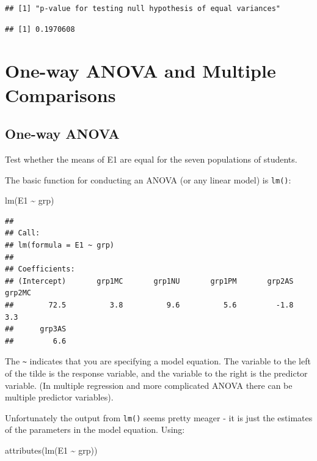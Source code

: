\documentclass[
]{book}
\newenvironment{Shaded}{\begin{snugshade}}{\end{snugshade}}
\newcommand{\FunctionTok}[1]{\textcolor[rgb]{0.00,0.00,0.00}{#1}}
\newcommand{\NormalTok}[1]{#1}
\newcommand{\SpecialCharTok}[1]{\textcolor[rgb]{0.00,0.00,0.00}{#1}}
\begin{document}
\begin{verbatim}
## [1] "p-value for testing null hypothesis of equal variances"
\end{verbatim}

\begin{verbatim}
## [1] 0.1970608
\end{verbatim}

\hypertarget{one-way-anova}{%
\section{One-way ANOVA and Multiple Comparisons}\label{one-way-anova}}

\hypertarget{one-way-anova-1}{%
\subsection{One-way ANOVA}\label{one-way-anova-1}}

Test whether the means of E1 are equal for the seven populations of students.

The basic function for conducting an ANOVA (or any linear model) is \texttt{lm()}:

\begin{Shaded}
\begin{Highlighting}[]
\FunctionTok{lm}\NormalTok{(E1 }\SpecialCharTok{\textasciitilde{}}\NormalTok{ grp)}
\end{Highlighting}
\end{Shaded}

\begin{verbatim}
## 
## Call:
## lm(formula = E1 ~ grp)
## 
## Coefficients:
## (Intercept)       grp1MC       grp1NU       grp1PM       grp2AS       grp2MC  
##        72.5          3.8          9.6          5.6         -1.8          3.3  
##      grp3AS  
##         6.6
\end{verbatim}

The \texttt{\textasciitilde{}} indicates that you are specifying a model equation. The variable to the left of the tilde is the response variable, and the variable to the right is the predictor variable. (In multiple regression and more complicated ANOVA there can be multiple predictor variables).

Unfortunately the output from \texttt{lm()} seems pretty meager - it is just the estimates of the parameters in the model equation. Using:

\begin{Shaded}
\begin{Highlighting}[]
\FunctionTok{attributes}\NormalTok{(}\FunctionTok{lm}\NormalTok{(E1 }\SpecialCharTok{\textasciitilde{}}\NormalTok{ grp))}
\end{Highlighting}
\end{Shaded}
\end{document}
